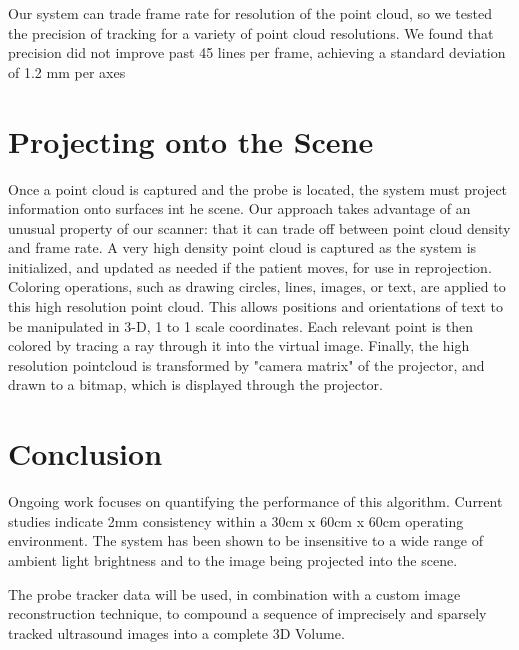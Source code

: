 \documentclass{llncs}
\begin{document}
Our system can trade frame rate for resolution of the point cloud, so we tested the precision of tracking for a variety of point cloud resolutions. We found that precision did not improve past 45 lines per frame, achieving a standard deviation of 1.2 mm per axes





\section{Projecting onto the Scene}

Once a point cloud is captured and the probe is located, the system must project information onto surfaces int he scene. Our approach takes advantage of an unusual property of our scanner: that it can trade off between point cloud density and frame rate. A very high density point cloud is captured as the system is initialized, and updated as needed if the patient moves, for use in reprojection. Coloring operations, such as drawing circles, lines, images, or text, are applied to this high resolution point cloud. This allows positions and orientations of text to be manipulated in 3-D, 1 to 1 scale coordinates. Each relevant point is then colored by tracing a ray through it into the virtual image. Finally, the high resolution pointcloud is transformed by "camera matrix" of the projector, and drawn to a bitmap, which is displayed through the projector. 

\section{Conclusion}
Ongoing work focuses on quantifying the performance of this algorithm.  Current studies indicate 2mm consistency within a 30cm x 60cm x 60cm operating environment.  The system has been shown to be insensitive to a wide range of ambient light brightness and to the image being projected into the scene.

The probe tracker data will be used, in combination with a custom image reconstruction technique, to compound a sequence of imprecisely and sparsely tracked ultrasound images into a complete 3D Volume.
\end{document}
